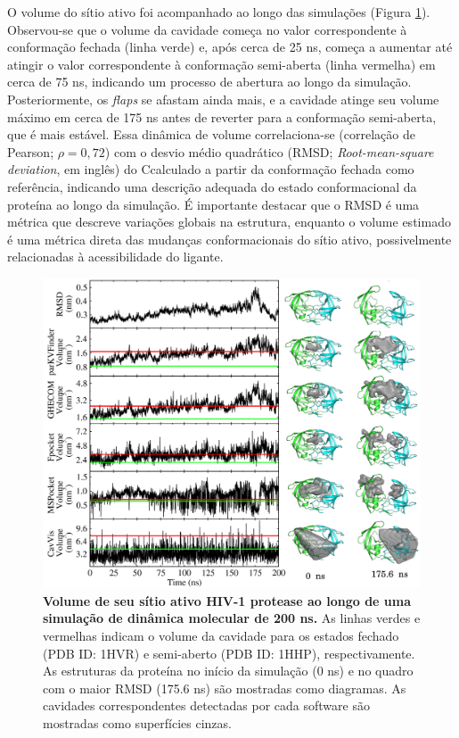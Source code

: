 \documentclass[Portugues]{phdquali}
\begin{document}
O volume do sítio ativo foi acompanhado ao longo das simulações (Figura \ref{fig:hiv1-protease-dm-analysis}). Observou-se que o volume da cavidade começa no valor correspondente à conformação fechada (linha verde) e, após cerca de 25 ns, começa a aumentar até atingir o valor correspondente à conformação semi-aberta (linha vermelha) em cerca de 75 ns, indicando um processo de abertura ao longo da simulação. Posteriormente, os \textit{flaps} se afastam ainda mais, e a cavidade atinge seu volume máximo em cerca de 175 ns antes de reverter para a conformação semi-aberta, que é mais estável. Essa dinâmica de volume correlaciona-se (correlação de Pearson; $\rho = 0,72$) com o desvio médio quadrático (RMSD; \textit{Root-mean-square deviation}, em inglês) do C\textalpha\space calculado a partir da conformação fechada como referência, indicando uma descrição adequada do estado conformacional da proteína ao longo da simulação. É importante destacar que o RMSD é uma métrica que descreve variações globais na estrutura, enquanto o volume estimado é uma métrica direta das mudanças conformacionais do sítio ativo, possivelmente relacionadas à acessibilidade do ligante.

\begin{figure}[ht]
  \centerline{\includegraphics[scale=0.15]{images/hiv1-protease-md-analysis.png}}
  \caption[Volume de seu sítio ativo HIV-1 protease ao longo de uma simulação de dinâmica molecular de 200 ns]{\textbf{Volume de seu sítio ativo HIV-1 protease ao longo de uma simulação de dinâmica molecular de 200 ns.} As linhas verdes e vermelhas indicam o volume da cavidade para os estados fechado (PDB ID: 1HVR) e semi-aberto (PDB ID: 1HHP), respectivamente. As estruturas da proteína no início da simulação (0 ns) e no quadro com o maior RMSD (175.6 ns) são mostradas como diagramas. As cavidades correspondentes detectadas por cada software são mostradas como superfícies cinzas.}
  \label{fig:hiv1-protease-dm-analysis}
\end{figure}
\end{document}
